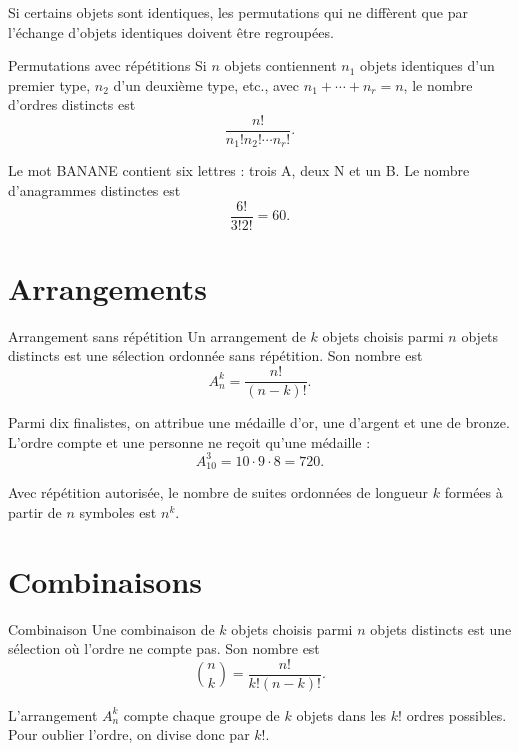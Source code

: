 \documentclass[12pt,a4paper,openany]{book}
\begin{document}
Si certains objets sont identiques, les permutations qui ne diffèrent que par l'échange d'objets identiques doivent être regroupées.

\begin{proposition}{Permutations avec répétitions}{}
Si $n$ objets contiennent $n_1$ objets identiques d'un premier type, $n_2$ d'un deuxième type, etc., avec $n_1+\cdots+n_r=n$, le nombre d'ordres distincts est
\[
\frac{n!}{n_1!n_2!\cdots n_r!}.
\]
\end{proposition}

\begin{examplebox}
Le mot \textsc{BANANE} contient six lettres : trois A, deux N et un B. Le nombre d'anagrammes distinctes est
\[
\frac{6!}{3!2!}=60.
\]
\end{examplebox}

\section{Arrangements}

\begin{definition}{Arrangement sans répétition}{}
Un arrangement de $k$ objets choisis parmi $n$ objets distincts est une sélection ordonnée sans répétition. Son nombre est
\[
A_n^k=\frac{n!}{(n-k)!}.
\]
\end{definition}

\begin{examplebox}
Parmi dix finalistes, on attribue une médaille d'or, une d'argent et une de bronze. L'ordre compte et une personne ne reçoit qu'une médaille :
\[
A_{10}^3=10\cdot9\cdot8=720.
\]
\end{examplebox}

Avec répétition autorisée, le nombre de suites ordonnées de longueur $k$ formées à partir de $n$ symboles est $n^k$.

\section{Combinaisons}

\begin{definition}{Combinaison}{}
Une combinaison de $k$ objets choisis parmi $n$ objets distincts est une sélection où l'ordre ne compte pas. Son nombre est
\[
\binom nk=\frac{n!}{k!(n-k)!}.
\]
\end{definition}

\begin{intuitionbox}
L'arrangement $A_n^k$ compte chaque groupe de $k$ objets dans les $k!$ ordres possibles. Pour oublier l'ordre, on divise donc par $k!$.
\end{intuitionbox}
\end{document}
